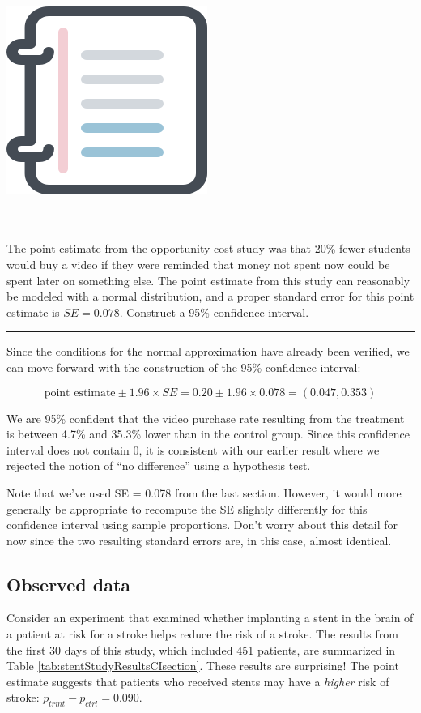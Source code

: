 \documentclass[
  10pt,
  openany]{book}
\newenvironment{mdframedwithfootGPWE}
{   
    \savenotes
    \begin{mdframed}[%
    topline=true, bottomline=true, linecolor=oiB, linewidth=0.5pt,
    rightline=false, leftline=false,
    backgroundcolor=oiLGray]
    \renewcommand{\thempfootnote}{\arabic{footnote}}
    }
{
    \end{mdframed}
    \spewnotes
}
\newenvironment{workedexample}{
    \let\oldrule\rule
    \renewcommand{\rule}[2]{\vspace{-2mm}\oldrule{##1}{##2}\vspace{-2mm}}
\vspace{4mm}
\begin{mdframedwithfootGPWE}
\begin{minipage}[t]{0.10\textwidth}
{$\:$ \\ \setkeys{Gin}{width=2.5em,keepaspectratio}\includegraphics{images/_icons/worked-example.png}}
\end{minipage}
\hfill
\begin{minipage}[t]{0.90\textwidth}
\vspace{-2mm}
\setlength{\parskip}{1em}
\noindent\textbf{\color{oiB}\small\fontfamily{phv}\selectfont{\MakeUppercase{Example}}} $\:$ \\ \\
}{\end{minipage}
\end{mdframedwithfootGPWE}
\vspace{4mm}
}
\begin{document}
\begin{workedexample}
The point estimate from the opportunity cost study was that 20\% fewer students would buy a video if they were reminded that money not spent now could be spent later on something else.
The point estimate from this study can reasonably be modeled with a normal distribution, and a proper standard error for this point estimate is \(SE = 0.078.\) Construct a 95\% confidence interval.

\begin{center}\rule{0.5\linewidth}{0.5pt}\end{center}

Since the conditions for the normal approximation have already been verified, we can move forward with the construction of the 95\% confidence interval:

\[\text{point estimate} \pm 1.96 \times SE = 0.20 \pm 1.96 \times 0.078 = (0.047, 0.353)\]

We are 95\% confident that the video purchase rate resulting from the treatment is between 4.7\% and 35.3\% lower than in the control group.
Since this confidence interval does not contain 0, it is consistent with our earlier result where we rejected the notion of ``no difference'' using a hypothesis test.

Note that we've used SE = 0.078 from the last section.
However, it would more generally be appropriate to recompute the SE slightly differently for this confidence interval using sample proportions.
Don't worry about this detail for now since the two resulting standard errors are, in this case, almost identical.

\end{workedexample}

\hypertarget{observed-data-6}{%
\subsection{Observed data}\label{observed-data-6}}

Consider an experiment that examined whether implanting a stent in the brain of a patient at risk for a stroke helps reduce the risk of a stroke.
The results from the first 30 days of this study, which included 451 patients, are summarized in Table \ref{tab:stentStudyResultsCIsection}.
These results are surprising!
The point estimate suggests that patients who received stents may have a \emph{higher} risk of stroke: \(p_{trmt} - p_{ctrl} = 0.090.\)
\end{document}
